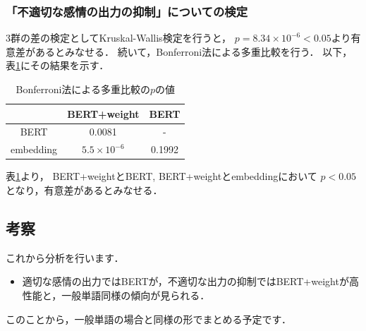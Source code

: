 	\subsubsection{「不適切な感情の出力の抑制」についての検定}
		3群の差の検定としてKruskal-Wallis検定を行うと，
		$p=8.34\times10^{-6}<0.05$より有意差があるとみなせる．
		続いて，Bonferroni法による多重比較を行う．
		以下，表\ref{table:jikken3_bad_Bonferroni}にその結果を示す．
		\begin{table}[H]
			\centering
			\caption{Bonferroni法による多重比較の$p$の値}
			\label{table:jikken3_bad_Bonferroni}
			\begin{tabular}{|c|c|c|}
				\hline
				& BERT+weight & BERT \\
				\hline
				BERT & 0.0081 & - \\
				\hline
				embedding & $ 5.5\times10^{-6} $ & 0.1992 \\
				\hline
			\end{tabular}
		\end{table}
		表\ref{table:jikken3_bad_Bonferroni}より，
		BERT+weightとBERT, BERT+weightとembeddingにおいて
		$p<0.05$となり，有意差があるとみなせる．

	\subsection{考察}
	これから分析を行います．
	\begin{itemize}
		\item 適切な感情の出力ではBERTが，不適切な出力の抑制ではBERT+weightが高性能と，一般単語同様の傾向が見られる．
	\end{itemize}
	このことから，一般単語の場合と同様の形でまとめる予定です．
